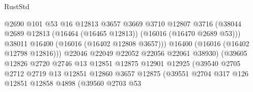 \begin{lexlean}{RustStd}
\begin{coremodule}
                                          @2690
                                          @101
                                          @53
                                          @16
                                          @12813
                                          @3657
                                          @3669
                                          @3710
                                          @12807
                                          @3716
                                          (@38044
                                            @2689
                                            @12813
                                            (@16464 (@16465 @12813))
                                            (@16016 (@16470 @2689 @53)))
                                          @38011
                                          @16400
                                          (@16016 (@16402 @12808 @3657)))
                                        @16400
                                        (@16016 (@16402 @12798 @12816)))
                                      @22046
                                      @22049
                                      @22052
                                      @22056
                                      @22061
                                      @38930)
                                    (@39605
                                      @12826
                                      @2720
                                      @2746
                                      @13
                                      @12851
                                      @12875
                                      @12901
                                      @12925
                                      (@39540
                                        @2705
                                        @2712
                                        @2719
                                        @13
                                        @12851
                                        @12860
                                        @3657
                                        @12875
                                        (@39551
                                          @2704
                                          @317
                                          @126
                                          @12851
                                          @12858
                                          @4898
                                          (@39560
                                            @2703
                                            @53

\end{coremodule}
\end{lexlean}
